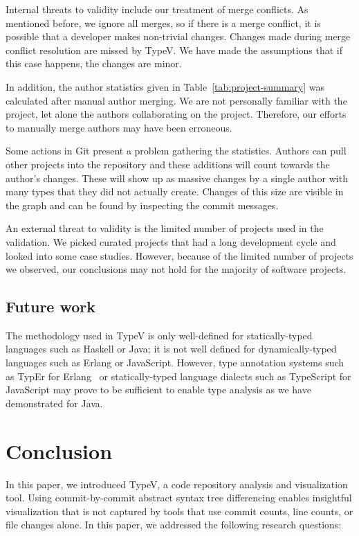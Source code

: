 Internal threats to validity include our treatment of merge conflicts. As mentioned before, we ignore all merges, so if there is a merge conflict, it is possible that a developer makes non-trivial changes. Changes made during merge conflict resolution are missed by TypeV. We have made the assumptions that if this case happens, the changes are minor.

In addition, the author statistics given in Table~\ref{tab:project-summary} was calculated after manual author merging. We are not personally familiar with the project, let alone the authors collaborating on the project. Therefore, our efforts to manually merge authors may have been erroneous.

Some actions in Git present a problem gathering the statistics. Authors can pull other projects into the repository and these additions will count towards the author's changes. These will show up as massive changes by a single author with many types that they did not actually create. Changes of this size are visible in the graph and can be found by inspecting the commit messages.

An external threat to validity is the limited number of projects used in the validation. We picked curated projects that had a long development cycle and looked into some case studies. However, because of the limited number of projects we observed, our conclusions may not hold for the majority of software projects.

\subsection{Future work}

The methodology used in TypeV is only well-defined for statically-typed languages such as Haskell or Java; it is not well defined for dynamically-typed languages such as Erlang or JavaScript. However, type annotation systems such as TypEr for Erlang~\cite{typer} or statically-typed language dialects such as TypeScript for JavaScript may prove to be sufficient to enable type analysis as we have demonstrated for Java.

\section{Conclusion}

In this paper, we introduced TypeV, a code repository analysis and visualization tool. Using commit-by-commit abstract syntax tree differencing enables insightful visualization that is not captured by tools that use commit counts, line counts, or file changes alone. In this paper, we addressed the following research questions:


